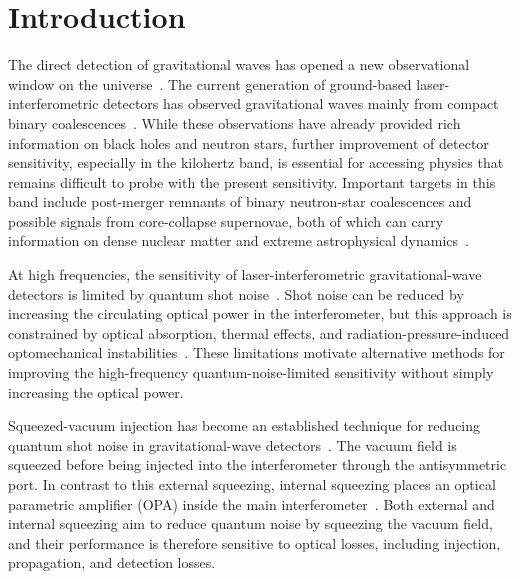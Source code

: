 \documentclass{iopjournal}
\begin{document}
\section{Introduction}

The direct detection of gravitational waves has opened a new observational window on the universe~\cite{Abbott2016Observation}. 
The current generation of ground-based laser-interferometric detectors has observed gravitational waves mainly from compact binary coalescences~\cite{Aasi2015AdvancedLIGO,Acernese2015AdvancedVirgo,Aso2013KAGRA,Abbott2023GWTC3}. 
While these observations have already provided rich information on black holes and neutron stars, further improvement of detector sensitivity, especially in the kilohertz band, is essential for accessing physics that remains difficult to probe with the present sensitivity. 
Important targets in this band include post-merger remnants of binary neutron-star coalescences and possible signals from core-collapse supernovae, both of which can carry information on dense nuclear matter and extreme astrophysical dynamics~\cite{Sarin2021PostMerger,Ackley2020NEMO}.

At high frequencies, the sensitivity of laser-interferometric gravitational-wave detectors is  limited by quantum shot noise~\cite{Caves1981QuantumNoise,Kimble2001QND}. 
Shot noise can be reduced by increasing the circulating optical power in the interferometer, but this approach is constrained by optical absorption, thermal effects, and radiation-pressure-induced optomechanical instabilities~\cite{Braginsky2001ParametricInstability,Sidles2006OpticalTorques}.
These limitations motivate alternative methods for improving the high-frequency quantum-noise-limited sensitivity without simply increasing the optical power.

Squeezed-vacuum injection has become an established technique for reducing quantum shot noise in gravitational-wave detectors~\cite{Goda2008Squeezed,Tse2019QuantumEnhanced,Acernese2019VirgoSqueezing}. 
The vacuum field is squeezed before being injected into the interferometer through the antisymmetric port. 
In contrast to this external squeezing, internal squeezing places an optical parametric amplifier (OPA) inside the main interferometer~\cite{Korobko2019QuantumExpander,Adya2020InternalSqueezing}. 
Both external and internal squeezing aim to reduce quantum noise by squeezing the vacuum field, and
their performance is therefore sensitive to optical losses, including injection, propagation, and detection losses.
\end{document}
